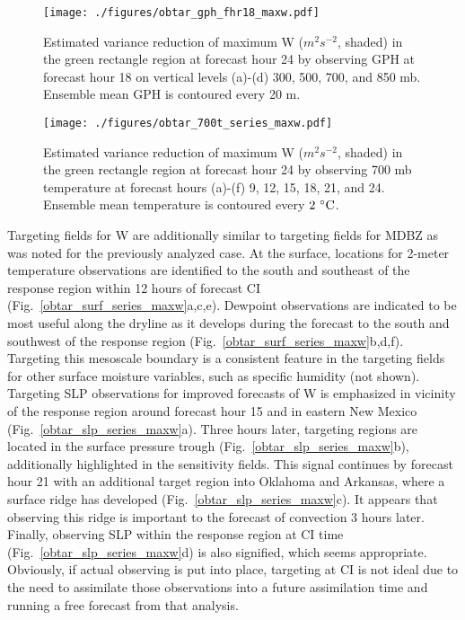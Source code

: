 \documentclass{ttuthes2007}
\newcommand{\tab}{\hspace*{2em}}  %
\begin{document}
\begin{figure}[!tb]
  \centering
  \noindent\texttt{[image: ./figures/obtar\_gph\_fhr18\_maxw.pdf]}\\
  \caption{Estimated variance reduction of maximum W ($m^2 s^{-2}$, shaded) in the green rectangle region at forecast hour 24 by observing GPH at forecast hour 18 on vertical levels (a)-(d) 300, 500, 700, and 850 mb. Ensemble mean GPH is contoured every 20 m.}
\label{obtar_gph_fhr18_maxw}
\end{figure}

\begin{figure}[!tb]
  \centering
  \noindent\texttt{[image: ./figures/obtar\_700t\_series\_maxw.pdf]}\\
  \caption{Estimated variance reduction of maximum W ($m^2 s^{-2}$, shaded) in the green rectangle region at forecast hour 24 by observing 700 mb temperature at forecast hours (a)-(f) 9, 12, 15, 18, 21, and 24. Ensemble mean temperature is contoured every $2^{~\circ} {\rm C}$.}
\label{obtar_700t_series_maxw}
\end{figure}

\tab Targeting fields for W are additionally similar to targeting fields for MDBZ as was noted for the previously analyzed case. At the surface, locations for 2-meter temperature observations are identified to the south and southeast of the response region within 12 hours of forecast CI (Fig.~\ref{obtar_surf_series_maxw}a,c,e). Dewpoint observations are indicated to be most useful along the dryline as it develops during the forecast to the south and southwest of the response region (Fig.~\ref{obtar_surf_series_maxw}b,d,f). Targeting this mesoscale boundary is a consistent feature in the targeting fields for other surface moisture variables, such as specific humidity (not shown). Targeting SLP observations for improved forecasts of W is emphasized in vicinity of the response region around forecast hour 15 and in eastern New Mexico (Fig.~\ref{obtar_slp_series_maxw}a). Three hours later, targeting regions are located in the surface pressure trough (Fig.~\ref{obtar_slp_series_maxw}b), additionally highlighted in the sensitivity fields. This signal continues by forecast hour 21 with an additional target region into Oklahoma and Arkansas, where a surface ridge has developed (Fig.~\ref{obtar_slp_series_maxw}c). It appears that observing this ridge is important to the forecast of convection 3 hours later. Finally, observing SLP within the response region at CI time (Fig.~\ref{obtar_slp_series_maxw}d) is also signified, which seems appropriate. Obviously, if actual observing is put into place, targeting at CI is not ideal due to the need to assimilate those observations into a future assimilation time and running a free forecast from that analysis. 
\end{document}

